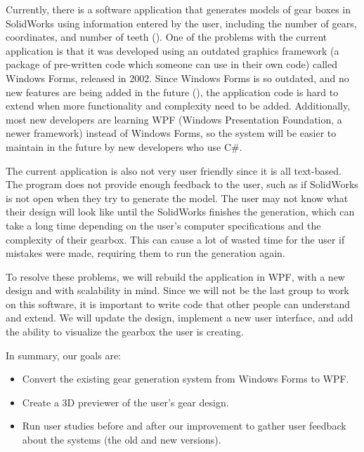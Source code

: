 \begin{doublespace}
Currently, there is a software application that generates models of gear boxes in SolidWorks using information entered by the user, including the number of gears, coordinates, and number of teeth (\cite{holman_automated_2018}). One of the problems with the current application is that it was developed using an outdated graphics framework (a package of pre-written code which someone can use in their own code) called Windows Forms, released in 2002. Since Windows Forms is so outdated, and no new features are being added in the future (\cite{allen_wpf_2014}), the application code is hard to extend when more functionality and complexity need to be added. Additionally, most new developers are learning WPF (Windows Presentation Foundation, a newer framework) instead of Windows Forms, so the system will be easier to maintain in the future by new developers who use C\#.

The current application is also not very user friendly since it is all text-based. The program does not provide enough feedback to the user, such as if SolidWorks is not open when they try to generate the model. The user may not know what their design will look like until the SolidWorks finishes the generation, which can take a long time depending on the user’s computer specifications and the complexity of their gearbox. This can cause a lot of wasted time for the user if mistakes were made, requiring them to run the generation again.

To resolve these problems, we will rebuild the application in WPF, with a new design and with scalability in mind. Since we will not be the last group to work on this software, it is important to write code that other people can understand and extend. We will update the design, implement a new user interface, and add the ability to visualize the gearbox the user is creating.

\begin{singlespace}
In summary, our goals are:
\begin{itemize}
    \item Convert the existing gear generation system from Windows Forms to WPF.
    \item Create a 3D previewer of the user's gear design.
    \item Run user studies before and after our improvement to gather user feedback about the systems (the old and new versions).
\end{itemize}
\end{singlespace}


\end{doublespace}
